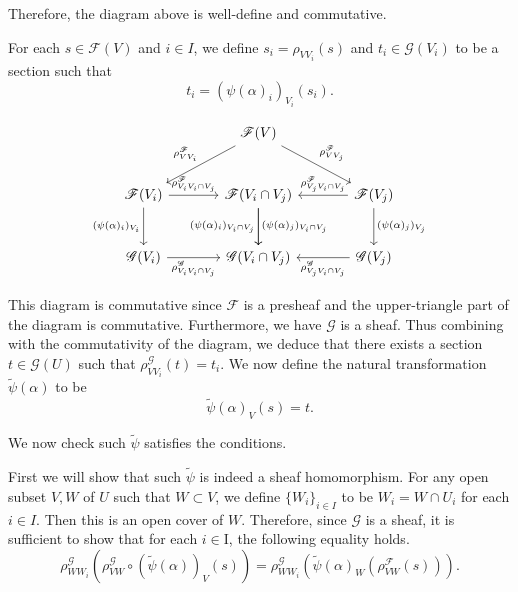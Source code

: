 \documentclass{article}
\begin{document}
Therefore, the diagram above is well-define and commutative. \\


\par For each $s\in\mathcal{F}(V)$ and $i\in I$, we define $s_i=\rho_{VV_i}(s)$ and $t_i\in\mathcal{G}(V_i)$ to be a section such that
\begin{equation*}
t_i = (\psi(\alpha)_i)_{V_i}(s_i).
\end{equation*}

\[ \begin{tikzcd}[row sep=large, column sep=large]
{}&\mathcal{F}(V)\arrow{ld}[swap]{\rho^{\mathcal{F}}_{VV_i}}\arrow{rd}{\rho^{\mathcal{F}}_{VV_j}}\\%
\mathcal{F}(V_i) \arrow{r}{\rho^{\mathcal{F}}_{V_iV_i\cap V_j}} \arrow[swap]{d}{(\psi(\alpha)_i)_{V_i}} & \mathcal{F}(V_i\cap V_j) \arrow{d}[swap]{(\psi(\alpha)_i)_{V_i\cap V_j}} \arrow{d}{(\psi(\alpha)_j)_{V_i\cap V_j}}&\arrow{l}[swap]{\rho^{\mathcal{F}}_{V_jV_i\cap V_j}} \mathcal{F}(V_j)\arrow{d}{(\psi(\alpha)_j)_{V_j}}\\%
\mathcal{G}(V_i) \arrow{r}[swap]{\rho^{\mathcal{G}}_{V_iV_i\cap V_j}} & \mathcal{G}(V_i\cap V_j)&\arrow{l}{\rho^{\mathcal{G}}_{V_jV_i\cap V_j}} \mathcal{G}(V_j)
\end{tikzcd}
\]

This diagram is commutative since $\mathcal{F}$ is a presheaf and the upper-triangle part of the diagram is commutative. Furthermore, we have $\mathcal{G}$ is a sheaf. Thus combining with the commutativity of the diagram, we deduce that there exists a section $t\in\mathcal{G}(U)$ such that $\rho^{\mathcal{G}}_{VV_i}(t)=t_i$. We now define the natural transformation $\tilde{\psi}(\alpha)$ to be
\begin{equation*}
\tilde{\psi}(\alpha)_V(s) = t.
\end{equation*}

We now check such $\tilde{\psi}$ satisfies the conditions.\\
\par First we will show that such $\tilde{\psi}$ is indeed a sheaf homomorphism. For any open subset $V,W$ of $U$ such that $W\subset V$, we define $\{W_i\}_{i\in I}$ to be $W_i=W\cap U_i$ for each $i\in I$. Then this is an open cover of $W$. Therefore, since $\mathcal{G}$ is a sheaf, it is sufficient to show that for each $i\in $I, the following equality holds.
\begin{equation*}
\rho^{\mathcal{G}}_{WW_i}(\rho^{\mathcal{G}}_{VW}\circ(\tilde{\psi}(\alpha))_V(s))=\rho^{\mathcal{G}}_{WW_i}(\tilde{\psi}(\alpha)_{W}(\rho^{\mathcal{F}}_{VW}(s))).
\end{equation*}
\end{document}
